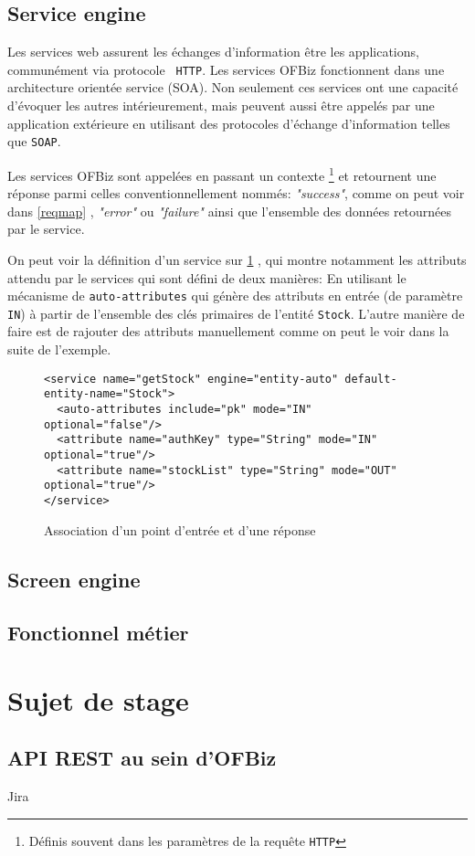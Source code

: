 \subsection{Service engine}
Les services web assurent les échanges d'information être les applications, communément via protocole \verb| HTTP|.   
Les services OFBiz fonctionnent dans une architecture orientée service (SOA). Non seulement ces services ont une capacité d'évoquer les autres intérieurement, mais peuvent aussi être appelés par une application extérieure en utilisant des protocoles d'échange d'information telles que \verb|SOAP|. 

Les services OFBiz sont appelées en passant un contexte \footnote{Définis souvent dans les paramètres de la requête \verb|HTTP| } et retournent une réponse parmi celles conventionnellement nommés: \emph{"success"}, comme on peut voir dans  \ref{reqmap} , \emph{"error"} ou \emph{"failure"} ainsi que l'ensemble des données retournées par le service. 

On peut voir la définition d'un service sur \ref{servicedef} , qui montre notamment les attributs attendu par le services qui sont défini de deux manières: En utilisant le mécanisme de \verb|auto-attributes| qui génère des attributs en entrée (de paramètre \verb|IN|) à partir de l'ensemble des clés primaires de l'entité \verb|Stock|. L'autre manière de faire est de rajouter des attributs manuellement comme on peut le voir dans la suite de l'exemple. 


\begin{figure}
\begin{lstlisting}
<service name="getStock" engine="entity-auto" default-entity-name="Stock">
  <auto-attributes include="pk" mode="IN" optional="false"/>
  <attribute name="authKey" type="String" mode="IN" optional="true"/>
  <attribute name="stockList" type="String" mode="OUT" optional="true"/>
</service>
\end{lstlisting}
\caption{Association d'un point d'entrée et d'une réponse}
\label{servicedef}
\end{figure}


\subsection{Screen engine}
\subsection{Fonctionnel métier}

\newpage
\section{Sujet de stage }



\subsection{API REST au sein d'OFBiz}

Jira

